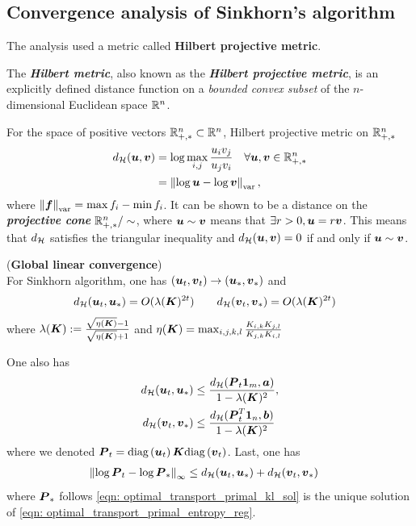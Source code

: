 \documentclass[11pt]{article}
\begin{document}
\subsection{Convergence analysis of Sinkhorn's algorithm}
The analysis used a metric called \textbf{Hilbert projective metric}. 
\begin{definition}
The \textbf{\emph{Hilbert metric}}, also known as the \textbf{\emph{Hilbert projective metric}}, is an explicitly defined distance function on a \emph{bounded convex subset} of the $n$-dimensional Euclidean space ${\mathbb R}^n$.

For the space of positive vectors ${\mathbb R}_{+, *}^{n} \subset {\mathbb R}^{n}$,  Hilbert projective metric on ${\mathbb R}_{+, *}^{n}$
\begin{align*}
d_{{\mathcal H}}(\boldsymbol{u}, \boldsymbol{v}) &= \log \max_{i,j}\frac{u_i v_j}{u_j v_i} \quad \forall \boldsymbol{u}, \boldsymbol{v} \in {\mathbb R}_{+, *}^{n} \\
&= \left\|\log \boldsymbol{u} - \log \boldsymbol{v}\right\|_{\text{var}},
\end{align*} where $\left\| \boldsymbol{f} \right\|_{\text{var}} = \max f_{i} - \min f_{i}$.  It can be shown to be a distance on the \emph{\textbf{projective cone}} $ {\mathbb R}_{+, *}^{n}/ \sim$, where $\boldsymbol{u} \sim \boldsymbol{v}$ means that $\exists r > 0, \boldsymbol{u} = r\boldsymbol{v}$. This means that $d_{{\mathcal H}}$ satisfies the triangular inequality and $d_{{\mathcal H}}(\boldsymbol{u}, \boldsymbol{v}) = 0$ if and only if $\boldsymbol{u} \sim \boldsymbol{v}$. 
\end{definition}

\begin{theorem}(\textbf{Global linear convergence}) \citep{franklin1989scaling}\\
For Sinkhorn algorithm, one has $(\boldsymbol{u}_{t}, \boldsymbol{v}_{t}) \rightarrow (\boldsymbol{u}_{*}, \boldsymbol{v}_{*})$ and 
\begin{align}
d_{{\mathcal H}}(\boldsymbol{u}_{t}, \boldsymbol{u}_{*}) = O(\lambda(\boldsymbol{K})^{2t}) \quad & \quad d_{{\mathcal H}}(\boldsymbol{v}_{t}, \boldsymbol{v}_{*}) = O(\lambda(\boldsymbol{K})^{2t})  \label{eqn: convergence_sinkhorn0}
\end{align} where $\lambda(\boldsymbol{K}) := \frac{\sqrt{\eta(\boldsymbol{K})} - 1}{\sqrt{\eta(\boldsymbol{K})} + 1} $ and $\eta(\boldsymbol{K}) =\max_{i,j,k,l} \frac{K_{i,k} K_{j,l}}{K_{j,k} K_{i,l}}$

One also has 
\begin{align}
d_{{\mathcal H}}(\boldsymbol{u}_{t}, \boldsymbol{u}_{*}) &\le \frac{d_{{\mathcal H}}(\boldsymbol{P}_{t}\boldsymbol{1}_{m}, \boldsymbol{a})}{1- \lambda(\boldsymbol{K})^2}, \label{eqn: convergence_sinkhorn1}\\
d_{{\mathcal H}}(\boldsymbol{v}_{t}, \boldsymbol{v}_{*}) &\le \frac{d_{{\mathcal H}}(\boldsymbol{P}_{t}^{T}\boldsymbol{1}_{n}, \boldsymbol{b})}{1- \lambda(\boldsymbol{K})^2} \nonumber
\end{align} where we denoted $\boldsymbol{P}_{t} =\text{diag}\left(\boldsymbol{u}_{t}\right)\boldsymbol{K}\text{diag}\left(\boldsymbol{v}_{t}\right)$. Last, one has
\begin{align}
\left\|\log \boldsymbol{P}_{t} - \log \boldsymbol{P}_{*}\right\|_{\infty} & \le d_{{\mathcal H}}(\boldsymbol{u}_{t}, \boldsymbol{u}_{*}) + d_{{\mathcal H}}(\boldsymbol{v}_{t}, \boldsymbol{v}_{*})  \label{eqn: convergence_sinkhorn2}
\end{align} where $\boldsymbol{P}_{*}$ follows \eqref{eqn: optimal_transport_primal_kl_sol} is the unique solution of \eqref{eqn: optimal_transport_primal_entropy_reg}.
\end{theorem}
\end{document}
